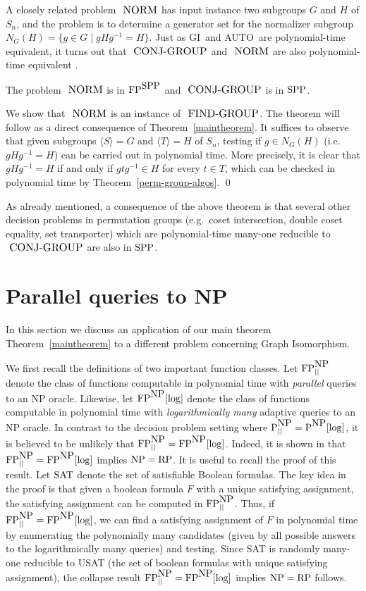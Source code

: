 \documentclass{elsart}
\newcommand{\p}{\mbox{\rm P}}
\newcommand{\NP}{\mbox{\rm NP}}
\newcommand{\RP}{\mbox{\rm RP}}
\newcommand{\FP}{\mbox{\rm FP}}
\newcommand{\SPP}{\mbox{\rm SPP}}
\newcommand{\AUTO}{\mbox{\small\rm AUTO}}
\newcommand{\FINDGROUP}{\mbox{\small\rm FIND{-}GROUP}}
\newcommand{\GI}{{\rm{GI}}}
\newcommand{\CONJGP}{\mbox{\small\rm CONJ{-}GROUP}}
\newcommand{\NORM}{\mbox{\small\rm NORM}}
\newcommand{\SAT}{\mbox{\rm SAT}}
\renewcommand{\angle}[1]{\langle #1\rangle}
\begin{document}
A closely related problem $\NORM$ has input instance two subgroups $G$
and $H$ of $S_n$, and the problem is to determine a generator set for
the normalizer subgroup $N_G(H)=\{g\in G\mid gHg^{-1}=H\}$. Just as
\GI\ and \AUTO\ are polynomial-time equivalent, it turns out that
$\CONJGP$ and $\NORM$ are also polynomial-time equivalent
\cite{luks93permutation}.

\begin{thm}
  The problem $\NORM$ is in $\FP^{\SPP}$ and $\CONJGP$ is in $\SPP$.
\end{thm}

\begin{pf}
  We show that $\NORM$ is an instance of $\FINDGROUP$. The theorem
  will follow as a direct consequence of Theorem~\ref{maintheorem}. It
  suffices to observe that given subgroups $\angle{S}=G$ and
  $\angle{T}=H$ of $S_n$, testing if $g\in N_G(H)$ (i.e.\
  $gHg^{-1}=H$) can be carried out in polynomial time.  More
  precisely, it is clear that $gHg^{-1}=H$ if and only if $gtg^{-1}\in
  H$ for every $t\in T$, which can be checked in polynomial time by
  Theorem~\ref{perm-group-algos}. \qed
\end{pf}

As already mentioned, a consequence of the above theorem is that
several other decision problems in permutation groups (e.g.\ coset
intersection, double coset equality, set transporter) which are
polynomial-time many-one reducible to $\CONJGP$ are also in $\SPP$.

\section{Parallel queries to NP}

In this section we discuss an application of our main theorem
Theorem~\ref{maintheorem} to a different problem concerning Graph
Isomorphism.

We first recall the definitions of two important function classes.
Let $\FP^{\NP}_{||}$ denote the class of functions computable in
polynomial time with \emph{parallel} queries to an NP oracle.
Likewise, let $\FP^{\NP}[\log]$ denote the class of functions
computable in polynomial time with \emph{logarithmically many}
adaptive queries to an NP oracle. In contrast to the decision problem
setting where $\p^{\NP}_{||}=\p^{\NP}[\log]$, it is believed to be
unlikely that $\FP^{\NP}_{||}=\FP^{\NP}[\log]$. Indeed, it is shown in
\cite{ESY84,S94,B95} that $\FP^{\NP}_{||}=\FP^{\NP}[\log]$ implies
$\NP=\RP$. It is useful to recall the proof of this result. Let $\SAT$
denote the set of satisfiable Boolean formulas. The key idea in the
proof is that given a boolean formula $F$ with a unique satisfying
assignment, the satisfying assignment can be computed in
$\FP^{\NP}_{||}$. Thus, if $\FP^{\NP}_{||}=\FP^{\NP}[\log]$, we can
find a satisfying assignment of $F$ in polynomial time by enumerating
the polynomially many candidates (given by all possible answers to the
logarithmically many queries) and testing. Since SAT is randomly
many-one reducible to USAT (the set of boolean formulas with unique
satisfying assignment), the collapse result
$\FP^{\NP}_{||}=\FP^{\NP}[\log]$ implies $\NP=\RP$ follows.
\end{document}
